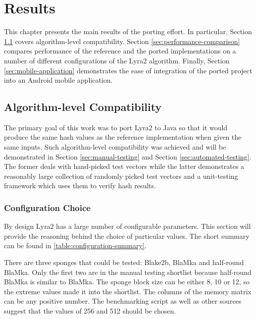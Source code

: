 \chapter{Results}
\label{sec:results}

This chapter presents the main results of the porting effort. In particular, Section \ref{sec:it-works} covers algorithm-level compatibility. Section \ref{sec:performance-comparison} compares performance of the reference and the ported implementations on a number of different configurations of the Lyra2 algorithm. Finally, Section \ref{sec:mobile-application} demonstrates the ease of integration of the ported project into an Android mobile application.

\section{Algorithm-level Compatibility}
\label{sec:it-works}

The primary goal of this work was to port Lyra2 to Java so that it would produce the same hash values as the reference implementation when given the same inputs. Such algorithm-level compatibility was achieved and will be demonstrated in Section \ref{sec:manual-testing} and Section \ref{sec:automated-testing}. The former deals with hand-picked test vectors while the latter demonstrates a reasonably large collection of randomly picked test vectors and a unit-testing framework which uses them to verify hash results.

\subsection{Configuration Choice}
By design Lyra2 has a large number of configurable parameters. This section will provide the reasoning behind the choice of particular values. The short summary can be found in \autoref{table:configuration-summary}.

There are three sponges that could be tested: Blake2b, BlaMka and half-round BlaMka. Only the first two are in the manual testing shortlist because half-round BlaMka is similar to BlaMka. The sponge block size can be either 8, 10 or 12, so the extreme values made it into the shortlist. The columns of the memory matrix can be any positive number. The  benchmarking script as well as other sources suggest that the values of 256 and 512 should be chosen.

